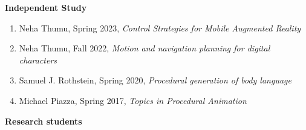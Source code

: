 {\bf Independent Study}
\vspace{-1.0em}

\begin{enumerate}[leftmargin=*,label={}]
  \item Neha Thumu, Spring 2023, \textit{Control Strategies for Mobile Augmented Reality}
  \item Neha Thumu, Fall 2022, \textit{Motion and navigation planning for digital characters}
  \item Samuel J. Rothstein, Spring 2020, \textit{Procedural generation of body language}
  \item Michael Piazza, Spring 2017, \textit{Topics in Procedural Animation}
\end{enumerate}

{\bf Research students} 
\vspace{-1.0em}

